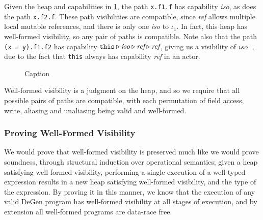 Given the heap and capabilities in \ref{fig:vis-4}, the path \texttt{x.f1.f} has capability \textit{iso}, as does the path \texttt{x.f2.f}. These path visibilities are compatible, since \textit{ref} allows multiple local mutable references, and there is only one \textit{iso} to $\iota_1$. In fact, this heap has well-formed visibility, so any pair of paths is compatible. Note also that the path \texttt{(x = y).f1.f2} has capability $\texttt{this} \extract \textit{iso} \triangleright \textit{ref} \triangleright \textit{ref}$, giving us a visibility of $\textit{iso}^-$, due to the fact that \texttt{this} always has capability \textit{ref} in an actor. 

\begin{figure}[H]
    \centering
    
    \caption{Caption}
    \label{fig:vis-4}
\end{figure}

Well-formed visibility is a judgment on the heap, and so we require that all possible pairs of paths are compatible, with each permutation of field access, write, aliasing and unaliasing being valid and well-formed.  

\subsubsection{Proving Well-Formed Visibility}

We would prove that well-formed visibility is preserved much like we would prove soundness, through structural induction over operational semantics; given a heap satisfying well-formed visibility, performing a single execution of a well-typed expression results in a new heap satisfying well-formed visibility, and the type of the expression. By proving it in this manner, we know that the execution of any valid DeGen program has well-formed visibility at all stages of execution, and by extension all well-formed programs are data-race free.
